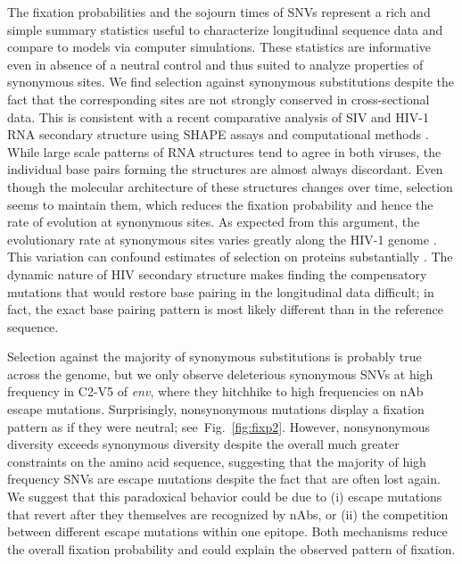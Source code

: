 \documentclass[rmp, twocolumn]{revtex4}
\newcommand{\FIG}[1]{Fig.~\ref{fig:#1}}
\newcommand{\env}{\textit{env}}
\newcommand{\shankaregion}{C2-V5}
\begin{document}
The fixation probabilities and the sojourn times of SNVs represent a rich and simple
summary statistics useful to characterize longitudinal sequence data and compare
to models via computer simulations. These statistics are informative
even in absence of a neutral control and thus suited to analyze
properties of synonymous sites. 
We find selection against synonymous substitutions  despite the
fact that the corresponding sites are not strongly conserved in
cross-sectional data. This is consistent with a recent comparative
analysis of SIV and HIV-1 RNA secondary structure using SHAPE assays and
computational methods \citep{pollom_comparison_2013}. While large scale
patterns of RNA structures tend to agree in both viruses, the individual
base pairs forming the structures are almost always
discordant. Even though the molecular architecture of these structures
changes over time, selection seems to maintain them, which reduces the
fixation probability and hence the rate of evolution at synonymous
sites. As expected from this argument, the evolutionary rate
at synonymous sites varies greatly along the HIV-1 genome
\citep{mayrose_towards_2007}. This variation can confound estimates of
selection on proteins substantially \citep{ngandu_extensive_2008}. 
The dynamic nature of HIV secondary structure makes finding the 
compensatory mutations that would restore base pairing in the
longitudinal data difficult; in fact, the exact base pairing pattern is
most likely different than in the reference sequence. 

Selection against the majority of synonymous substitutions is probably
true across the genome, but we only observe deleterious synonymous SNVs
at high frequency in \shankaregion{} of \env{}, where they hitchhike to
high frequencies on nAb escape mutations. Surprisingly, nonsynonymous
mutations display a fixation pattern as if they were neutral;
see~\FIG{fixp2}. However, nonsynonymous diversity exceeds
synonymous diversity despite the overall much greater constraints on the
amino acid sequence, suggesting that the majority of high frequency SNVs
are escape mutations despite the fact that are often lost again. We suggest that this
paradoxical behavior could be due to (i) escape
mutations that revert after they themselves are recognized by nAbs, or (ii)
the competition between different escape mutations within one epitope. 
Both mechanisms reduce the overall fixation probability and could
explain the observed pattern of fixation.
\end{document}
